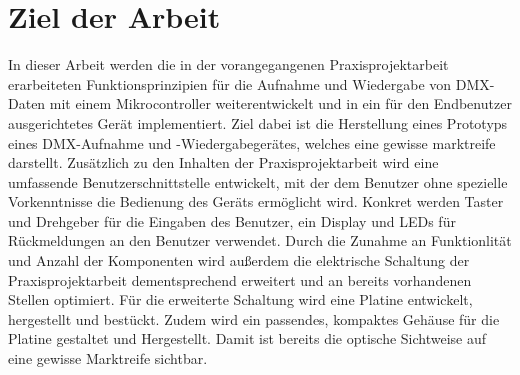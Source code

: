 
\newpage
\section{Ziel der Arbeit}
\label{sec:Ziel}
In dieser Arbeit werden die in der vorangegangenen Praxisprojektarbeit erarbeiteten Funktionsprinzipien für die Aufnahme und Wiedergabe von DMX-Daten mit einem Mikrocontroller weiterentwickelt und in ein für den Endbenutzer ausgerichtetes Gerät implementiert. Ziel dabei ist die Herstellung eines Prototyps eines DMX-Aufnahme und -Wiedergabegerätes, welches eine gewisse marktreife darstellt. Zusätzlich zu den Inhalten der Praxisprojektarbeit wird eine umfassende Benutzerschnittstelle entwickelt, mit der dem Benutzer ohne spezielle Vorkenntnisse die Bedienung des Geräts ermöglicht wird. Konkret werden Taster und Drehgeber für die Eingaben des Benutzer, ein Display und LEDs für Rückmeldungen an den Benutzer verwendet. Durch die Zunahme an Funktionlität und Anzahl der Komponenten wird außerdem die elektrische Schaltung der Praxisprojektarbeit dementsprechend erweitert und an bereits vorhandenen Stellen optimiert. Für die erweiterte Schaltung wird eine Platine entwickelt, hergestellt und bestückt. Zudem wird ein passendes, kompaktes Gehäuse für die Platine gestaltet und Hergestellt. Damit ist bereits die optische Sichtweise auf eine gewisse Marktreife sichtbar.

